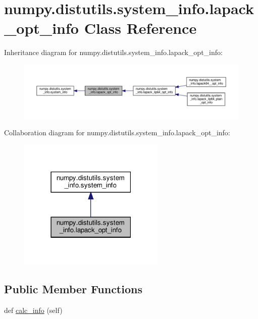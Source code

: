 \hypertarget{classnumpy_1_1distutils_1_1system__info_1_1lapack__opt__info}{}\section{numpy.\+distutils.\+system\+\_\+info.\+lapack\+\_\+opt\+\_\+info Class Reference}
\label{classnumpy_1_1distutils_1_1system__info_1_1lapack__opt__info}


Inheritance diagram for numpy.\+distutils.\+system\+\_\+info.\+lapack\+\_\+opt\+\_\+info\+:
\nopagebreak
\begin{figure}[H]
\begin{center}
\leavevmode
\includegraphics[width=350pt]{classnumpy_1_1distutils_1_1system__info_1_1lapack__opt__info__inherit__graph}
\end{center}
\end{figure}


Collaboration diagram for numpy.\+distutils.\+system\+\_\+info.\+lapack\+\_\+opt\+\_\+info\+:
\nopagebreak
\begin{figure}[H]
\begin{center}
\leavevmode
\includegraphics[width=198pt]{classnumpy_1_1distutils_1_1system__info_1_1lapack__opt__info__coll__graph}
\end{center}
\end{figure}
\subsection*{Public Member Functions}
\begin{DoxyCompactItemize}
\item 
def \hyperlink{classnumpy_1_1distutils_1_1system__info_1_1lapack__opt__info_afa68afa3bd34080125b37b226f563443}{calc\+\_\+info} (self)
\end{DoxyCompactItemize}
